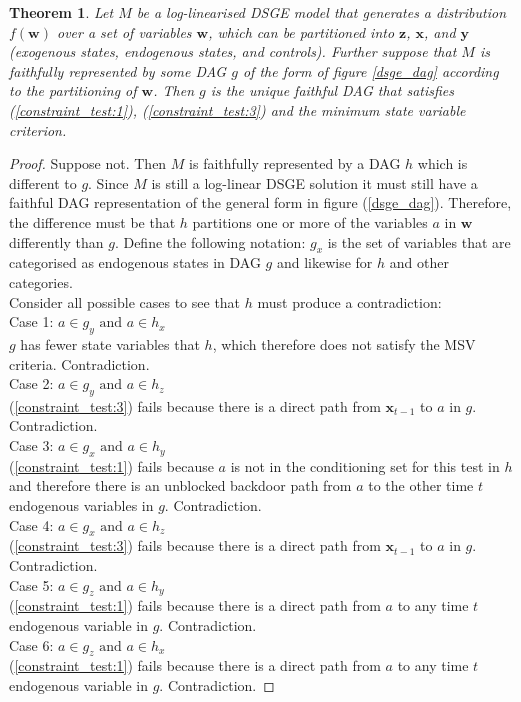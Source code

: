\documentclass{article}
\newtheorem{theorem}{Theorem}
\begin{document}
\theoremstyle{definition}
\begin{theorem}
  Let $M$ be a log-linearised DSGE model that generates a distribution $f(\mathbf{w})$ over a set of variables $\mathbf{w}$, which can be partitioned into $\mathbf{z}$, $\mathbf{x}$, and $\mathbf{y}$ (exogenous states, endogenous states, and controls). Further suppose that $M$ is \textit{faithfully represented} by some DAG $g$ of the form of figure \ref{dsge_dag} according to the partitioning of $\mathbf{w}$. Then $g$ is the unique faithful DAG that satisfies (\ref{constraint_test:1}), (\ref{constraint_test:3}) and the minimum state variable criterion.
\end{theorem}
\begin{proof}
  Suppose not. Then $M$ is faithfully represented by a DAG $h$ which is different to $g$. Since $M$ is still a log-linear DSGE solution it must still have a faithful DAG representation of the general form in figure (\ref{dsge_dag}). Therefore, the difference must be that $h$ partitions one or more of the variables $a$ in $\mathbf{w}$ differently than $g$. Define the following notation: $g_x$ is the set of variables that are categorised as endogenous states in DAG  $g$ and likewise for $h$ and other categories. \\
  Consider all possible cases to see that $h$ must produce a contradiction: \\
  Case 1: $a \in g_y \text{ and } a \in h_x$ \\
    $g$ has fewer state variables that $h$, which therefore does not satisfy the MSV criteria. Contradiction. \\
  Case 2: $a \in g_y \text{ and } a \in h_z$ \\
    (\ref{constraint_test:3}) fails because there is a direct path from $\mathbf{x}_{t-1}$ to $a$ in $g$. Contradiction. \\
  Case 3: $a \in g_x \text{ and } a \in h_y$ \\
    (\ref{constraint_test:1}) fails because $a$ is not in the conditioning set for this test in $h$ and therefore there is an unblocked backdoor path from $a$ to the other time $t$ endogenous variables in $g$. Contradiction. \\
  Case 4: $a \in g_x \text{ and } a \in h_z$ \\
    (\ref{constraint_test:3}) fails because there is a direct path from $\mathbf{x}_{t-1}$ to $a$ in $g$. Contradiction. \\
  Case 5: $a \in g_z \text{ and } a \in h_y$ \\
    (\ref{constraint_test:1}) fails because there is a direct path from $a$ to any time $t$ endogenous variable in $g$. Contradiction. \\
  Case 6: $a \in g_z \text{ and } a \in h_x$ \\
    (\ref{constraint_test:1}) fails because there is a direct path from $a$ to any time $t$ endogenous variable in $g$. Contradiction. 
\end{proof}
\end{document}
